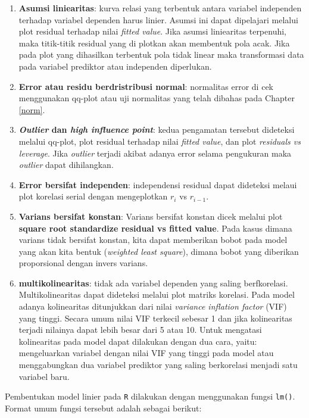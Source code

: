 \documentclass[
]{book}
\providecommand{\tightlist}{%
  \setlength{\itemsep}{0pt}\setlength{\parskip}{0pt}}
\theoremstyle{definition}
\theoremstyle{definition}
\theoremstyle{definition}
\theoremstyle{definition}
\theoremstyle{remark}
\begin{document}
\begin{enumerate}
\def\labelenumi{\arabic{enumi}.}
\tightlist
\item
  \textbf{Asumsi liniearitas}: kurva relasi yang terbentuk antara variabel independen terhadap variabel dependen harus linier. Asumsi ini dapat dipelajari melalui plot residual terhadap nilai \emph{fitted value}. Jika asumsi liniearitas terpenuhi, maka titik-titik residual yang di plotkan akan membentuk pola acak. Jika pada plot yang dihasilkan terbentuk pola tidak linear maka transformasi data pada variabel prediktor atau independen diperlukan.
\item
  \textbf{Error atau residu berdristribusi normal}: normalitas error di cek menggunakan qq-plot atau uji normalitas yang telah dibahas pada Chapter \ref{norm}.
\item
  \textbf{\emph{Outlier} dan \emph{high influence point}}: kedua pengamatan tersebut dideteksi melalui qq-plot, plot residual terhadap nilai \emph{fitted value}, dan plot \emph{residuals vs leverage}. Jika \emph{outlier} terjadi akibat adanya error selama pengukuran maka \emph{outlier} dapat dihilangkan.
\item
  \textbf{Error bersifat independen}: independensi residual dapat dideteksi melaui plot korelasi serial dengan mengeplotkan \(r_i\) vs \(r_{i-1}\).
\item
  \textbf{Varians bersifat konstan}: Varians bersifat konstan dicek melalui plot \textbf{square root standardize residual vs fitted value}. Pada kasus dimana varians tidak bersifat konstan, kita dapat memberikan bobot pada model yang akan kita bentuk (\emph{weighted least square}), dimana bobot yang diberikan proporsional dengan invers varians.
\item
  \textbf{multikolinearitas}: tidak ada variabel dependen yang saling berfkorelasi. Multikolinearitas dapat dideteksi melalui plot matriks korelasi. Pada model adanya kolinearitas ditunjukkan dari nilai \emph{variance inflation factor} (VIF) yang tinggi. Secara umum nilai VIF terkecil sebesar 1 dan jika kolinearitas terjadi nilainya dapat lebih besar dari 5 atau 10. Untuk mengatasi kolinearitas pada model dapat dilakukan dengan dua cara, yaitu: mengeluarkan variabel dengan nilai VIF yang tinggi pada model atau menggabungkan dua variabel prediktor yang saling berkorelasi menjadi satu variabel baru.
\end{enumerate}

Pembentukan model linier pada \texttt{R} dilakukan dengan menggunakan fungsi \texttt{lm()}. Format umum fungsi tersebut adalah sebagai berikut:
\end{document}
